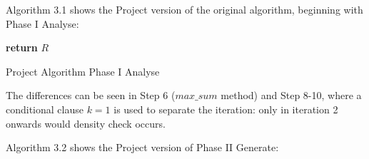 Algorithm 3.1 shows the Project version of the original algorithm, beginning with Phase I Analyse: 

\begin{SgAlgorithm}[!htbp]
    
    
    \textbf{return } $R$			
    \caption[Project Algorithm Phase I Analyse]{Project Algorithm Phase I Analyse}
    \label{algo:algo1}
\end{SgAlgorithm}

The differences can be seen in Step 6 ($max\_sum$ method) and Step 8-10, where a conditional clause $k = 1$ is used to separate the iteration: only in iteration 2 onwards would density check occurs.

Algorithm 3.2 shows the Project version of Phase II Generate:

